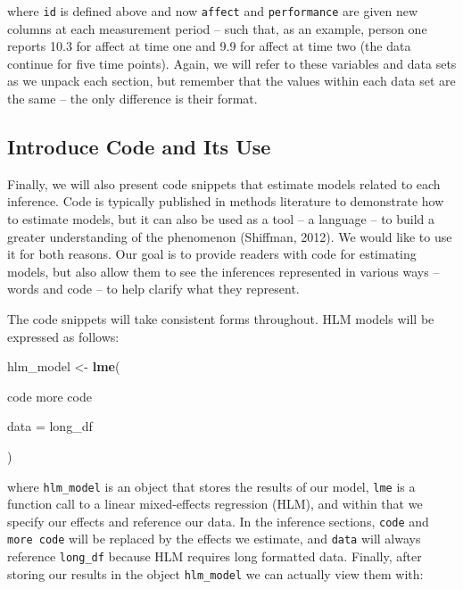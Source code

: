\documentclass[english,,man]{apa6}
\newenvironment{Shaded}{\begin{snugshade}}{\end{snugshade}}
\newcommand{\DataTypeTok}[1]{\textcolor[rgb]{0.13,0.29,0.53}{#1}}
\newcommand{\KeywordTok}[1]{\textcolor[rgb]{0.13,0.29,0.53}{\textbf{#1}}}
\newcommand{\NormalTok}[1]{#1}
\newcommand{\StringTok}[1]{\textcolor[rgb]{0.31,0.60,0.02}{#1}}
\theoremstyle{definition}
\theoremstyle{definition}
\theoremstyle{definition}
\theoremstyle{remark}
\begin{document}
\noindent where \texttt{id} is defined above and now \texttt{affect} and
\texttt{performance} are given new columns at each measurement period --
such that, as an example, person one reports 10.3 for affect at time one
and 9.9 for affect at time two (the data continue for five time points).
Again, we will refer to these variables and data sets as we unpack each
section, but remember that the values within each data set are the same
-- the only difference is their format.

\hypertarget{introduce-code-and-its-use}{%
\subsection{Introduce Code and Its
Use}\label{introduce-code-and-its-use}}

Finally, we will also present code snippets that estimate models related
to each inference. Code is typically published in methods literature to
demonstrate how to estimate models, but it can also be used as a tool --
a language -- to build a greater understanding of the phenomenon
(Shiffman, 2012). We would like to use it for both reasons. Our goal is
to provide readers with code for estimating models, but also allow them
to see the inferences represented in various ways -- words and code --
to help clarify what they represent.

The code snippets will take consistent forms throughout. HLM models will
be expressed as follows:

\begin{Shaded}
\begin{Highlighting}[]
\NormalTok{hlm_model <-}\StringTok{ }\KeywordTok{lme}\NormalTok{(}
  
\NormalTok{  code}
\NormalTok{  more code}
  
  \DataTypeTok{data =}\NormalTok{ long_df}
  
\NormalTok{)}
\end{Highlighting}
\end{Shaded}

\noindent where \texttt{hlm\_model} is an object that stores the results
of our model, \texttt{lme} is a function call to a linear mixed-effects
regression (HLM), and within that we specify our effects and reference
our data. In the inference sections, \texttt{code} and
\texttt{more\ code} will be replaced by the effects we estimate, and
\texttt{data} will always reference \texttt{long\_df} because HLM
requires long formatted data. Finally, after storing our results in the
object \texttt{hlm\_model} we can actually view them with:
\end{document}

